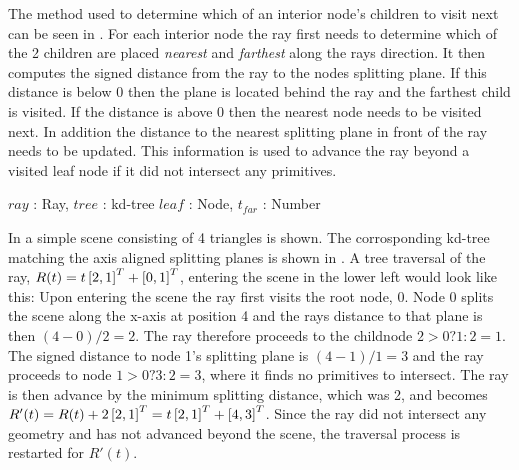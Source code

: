 
The method used to determine which of an interior node's children to
visit next can be seen in . For each
interior node the ray first needs to determine which of the 2 children
are placed \textit{nearest} and \textit{farthest} along the rays
direction. It then computes the signed distance from the ray to the
nodes splitting plane. If this distance is below 0 then the plane is
located behind the ray and the farthest child is visited. If the
distance is above 0 then the nearest node needs to be visited next. In
addition the distance to the nearest splitting plane in front of the
ray needs to be updated. This information is used to advance the ray
beyond a visited leaf node if it did not intersect any primitives.

\begin{algorithm}
  \caption{A basic kd-tree traversal algorithm}
  \label{alg:generelTraversal}
  \begin{algorithmic}
              {$ray$ : Ray, $tree$ : kd-tree}
              {$leaf$ : Node, $t_{far}$ : Number}{
                  \ELSE
                  \ENDIF
                \ENDWHILE
              }
  \end{algorithmic}
\end{algorithm}

In  a simple scene consisting of 4 triangles
is shown. The corrosponding kd-tree matching the axis aligned
splitting planes is shown in . A tree traversal
of the ray, $R(t) = t \left[2, 1 \right]^T + \left[0, 1 \right]^T$, entering the
scene in the lower left would look like this: Upon entering the scene
the ray first visits the root node, 0. Node 0 splits the scene along
the x-axis at position 4 and the rays distance to that plane is then
$(4 - 0) / 2 = 2$. The ray therefore proceeds to the childnode $2 > 0
? 1 : 2 = 1$. The signed distance to node 1's splitting plane is $(4 -
1) / 1 = 3$ and the ray proceeds to node $1 > 0 ? 3 : 2 = 3$, where it
finds no primitives to intersect. The ray is then advance by the
minimum splitting distance, which was 2, and becomes $R'(t) = R(t) + 2
\left[2, 1 \right]^T = t \left[2, 1 \right]^T + \left[4, 3 \right]^T$. Since the ray did
not intersect any geometry and has not advanced beyond the scene, the
traversal process is restarted for $R'(t)$.



